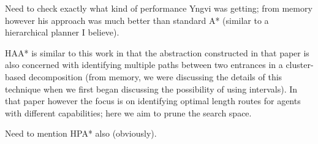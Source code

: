 Need to check exactly what kind of performance Yngvi was getting; from memory however his approach was much better than standard A* (similar to a hierarchical planner I believe).
\par
HAA* is similar to this work in that the abstraction constructed in that paper is also concerned with identifying multiple paths between two entrances in a cluster-based decomposition (from memory, we were discussing the details of this technique when we first began discussing the possibility of using intervals). In that paper however the focus is on identifying optimal length routes for agents with different capabilities; here we aim to prune the search space. 
\par 
Need to mention HPA* also (obviously).
